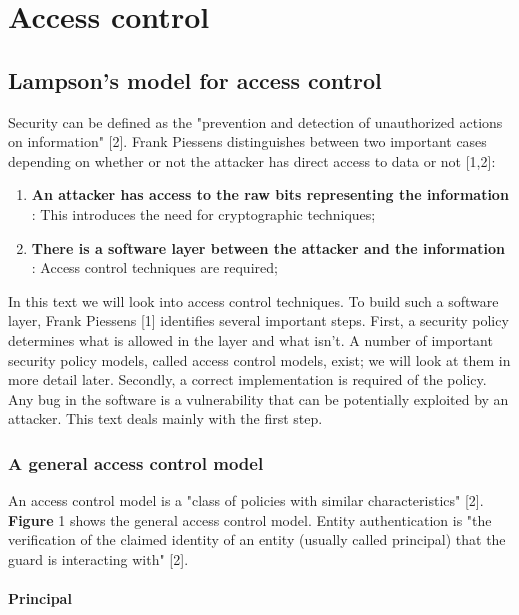 \chapter{Access control}\label{chapter:access-control}

\section{Lampson's model for access control}

Security can be defined as the "prevention and detection of unauthorized actions on information" [2]. Frank Piessens distinguishes between two important cases depending on whether or not the attacker has direct access to data or not [1,2]:
\begin{enumerate}
	\item \textbf{An attacker has access to the raw bits representing the information} : This introduces the need for cryptographic techniques;
	\item \textbf{There is a software layer between the attacker and the information} : Access control techniques are required;
\end{enumerate}

In this text we will look into access control techniques. To build such a software layer, Frank Piessens [1] identifies several important steps. First, a security policy determines what is allowed in the layer and what isn't. A number of important security policy models, called access control models, exist; we will look at them in more detail later. Secondly, a correct implementation is required of the policy. Any bug in the software is a vulnerability that can be potentially exploited by an attacker. This text deals mainly with the first step.

\subsection{A general access control model}

An access control model is a "class of policies with similar characteristics" [2]. \textbf{Figure} 1 shows the general access control model. Entity authentication is "the verification of the claimed identity of an entity (usually called principal) that the guard is interacting with" [2].

\subsubsection{Principal}

